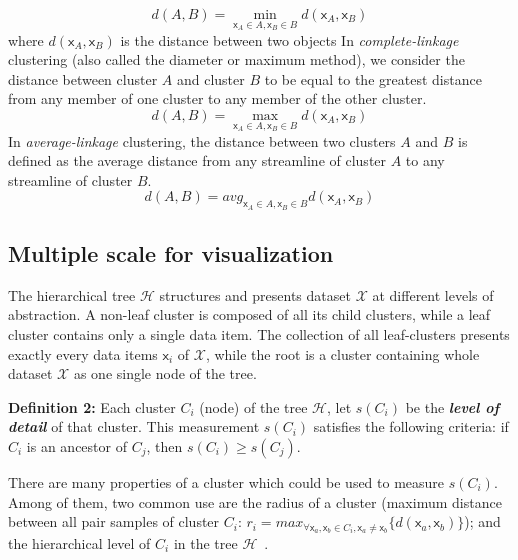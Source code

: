 \begin{equation}
\label{eq:distance_single_linkage}
d(A, B) = \min_{\mathsf{x}_A \in {A},\mathsf{x}_B \in {B}} d(\mathsf{x}_A,\mathsf{x}_B)
\end{equation}
where $d(\mathsf{x}_A,\mathsf{x}_B)$ is the distance between two objects
In \emph{complete-linkage} clustering (also called the diameter or maximum method), we consider the distance between cluster $A$ and cluster $B$ to be equal to the greatest distance from any member of one cluster to any member of the other cluster.
\begin{equation}
\label{eq:distance_complete_linkage}
d(A, B) = \max_{\mathsf{x}_A \in {A},\mathsf{x}_B \in {B}} d(\mathsf{x}_A,\mathsf{x}_B)
\end{equation}
In \emph{average-linkage} clustering, the distance between two clusters $A$ and $B$ is defined as the average distance from any streamline of cluster $A$ to any streamline of cluster $B$.
\begin{equation}
\label{eq:distance_average_linkage}
d(A, B) = avg_{\mathsf{x}_A \in {A},\mathsf{x}_B \in {B}} d(\mathsf{x}_A,\mathsf{x}_B)
\end{equation}

\subsection{Multiple scale for visualization}
\label{sec:multiscale}
The hierarchical tree $\mathcal{H}$ structures and presents dataset $\mathcal{X}$ at different levels of abstraction. A non-leaf cluster is composed of all its child clusters, while a leaf cluster contains only a single data item. The collection of all leaf-clusters presents exactly every data items $\mathsf{x}_i$ of $\mathcal{X}$, while the root is a cluster containing whole dataset $\mathcal{X}$ as one single node of the tree.

\textbf{Definition 2:} Each cluster $C_i$ (node) of the tree $\mathcal{H}$, let $s(C_i)$ be the \textbf{\textit{level of detail}} of that cluster. This measurement $s(C_i)$ satisfies the following criteria: if $C_i$ is an ancestor of $C_j$, then $s(C_i) \geq s(C_j)$. 

There are many properties of a cluster which could be used to measure $s(C_i)$. Among of them, two common use are the radius of a cluster (maximum distance between all pair samples of cluster $C_i$: $r_i = max_{\forall \mathsf{x}_a, \mathsf{x}_b
 \in C_i, \mathsf{x}_a \neq \mathsf{x}_b} \{d(\mathsf{x}_a,\mathsf{x}_b)\}$); and the hierarchical level of $C_i$ in the tree $\mathcal{H}$~\cite{yang2003interactive}.


